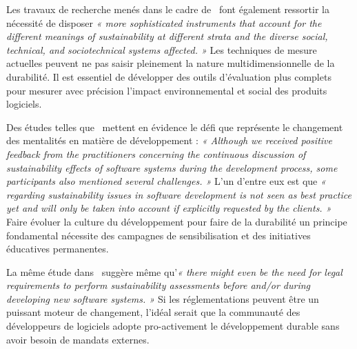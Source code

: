 Les travaux de recherche menés dans le cadre de~\cite{SustainableStratifiedTheory} font également ressortir la nécessité de disposer \emph{« more sophisticated instruments that account for the different meanings of sustainability at different strata and the diverse social, technical, and sociotechnical systems affected. »} Les techniques de mesure actuelles peuvent ne pas saisir pleinement la nature multidimensionnelle de la durabilité. Il est essentiel de développer des outils d'évaluation plus complets pour mesurer avec précision l'impact environnemental et social des produits logiciels.


Des études telles que~\cite{SustainabilityAwarenessFramework} mettent en évidence le défi que représente le changement des mentalités en matière de développement : \emph{« Although we received positive feedback from the practitioners concerning the continuous discussion of sustainability effects of software systems during the development process, some participants also mentioned several challenges. »} L'un d'entre eux est que \emph{« regarding sustainability issues in software development is not seen as best practice yet and will only be taken into account if explicitly requested by the clients. »} Faire évoluer la culture du développement pour faire de la durabilité un principe fondamental nécessite des campagnes de sensibilisation et des initiatives éducatives permanentes.


La même étude dans~\cite{SustainabilityAwarenessFramework} suggère même qu'\emph{« there might even be the need for legal requirements to perform sustainability assessments before and/or during developing new software systems. »} Si les réglementations peuvent être un puissant moteur de changement, l'idéal serait que la communauté des développeurs de logiciels adopte pro-activement le développement durable sans avoir besoin de mandats externes.


